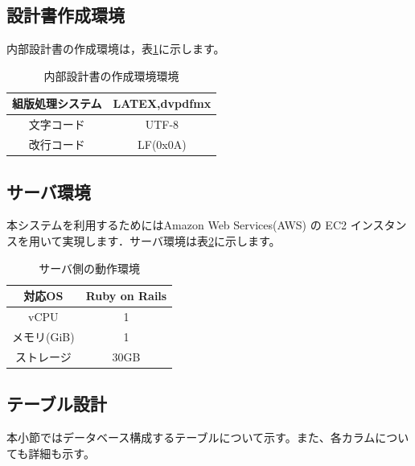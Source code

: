 \documentclass[a4j]{jarticle}
\begin{document}
\subsection{設計書作成環境}
内部設計書の作成環境は，表\ref{tab:creating_environment}に示します。
\begin{table}[htb]
\caption{内部設計書の作成環境環境}
\begin{center}
  \begin{tabular}{|c|c|} \hline
    組版処理システム & LATEX,dvpdfmx\\ \hline
   文字コード &  UTF-8\\ \hline
    改行コード & LF(0x0A)  \\ \hline
  \end{tabular}
\label{tab:creating_environment}
\end{center}
\end{table}
\subsection{サーバ環境}
本システムを利用するためにはAmazon Web Services(AWS) の EC2 インスタンスを用いて実現します．サーバ環境は表\ref{tab:server_environment}に示します。
\begin{table}[htb]
\caption{サーバ側の動作環境}
\begin{center}
  \begin{tabular}{|c|c|} \hline
    対応OS & Ruby on Rails \\ \hline
   vCPU & 1\\ \hline
    メモリ(GiB) & 1  \\ \hline
    ストレージ & 30GB \\ \hline
  \end{tabular}
\label{tab:server_environment}
\end{center}
\end{table}
\subsection{テーブル設計}
本小節ではデータベース構成するテーブルについて示す。また、各カラムについても詳細も示す。
\end{document}

